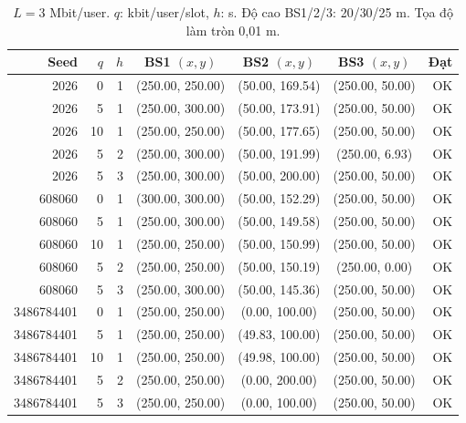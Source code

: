 \begin{table}
\centering
\renewcommand{\arraystretch}{1.16}
\setlength{\tabcolsep}{5pt}
\begin{tabular}{rrrcccr}
\toprule
Seed & $q$ & $h$ & BS1 $(x,y)$ & BS2 $(x,y)$ & BS3 $(x,y)$ & Đạt \\
\midrule
2026 & 0 & 1 & (250.00, 250.00) & (50.00, 169.54) & (250.00, 50.00) & OK \\
2026 & 5 & 1 & (250.00, 300.00) & (50.00, 173.91) & (250.00, 50.00) & OK \\
2026 & 10 & 1 & (250.00, 250.00) & (50.00, 177.65) & (250.00, 50.00) & OK \\
2026 & 5 & 2 & (250.00, 300.00) & (50.00, 191.99) & (250.00, 6.93) & OK \\
2026 & 5 & 3 & (250.00, 300.00) & (50.00, 200.00) & (250.00, 50.00) & OK \\
608060 & 0 & 1 & (300.00, 300.00) & (50.00, 152.29) & (250.00, 50.00) & OK \\
608060 & 5 & 1 & (250.00, 300.00) & (50.00, 149.58) & (250.00, 50.00) & OK \\
608060 & 10 & 1 & (250.00, 250.00) & (50.00, 150.99) & (250.00, 50.00) & OK \\
608060 & 5 & 2 & (250.00, 250.00) & (50.00, 150.19) & (250.00, 0.00) & OK \\
608060 & 5 & 3 & (250.00, 300.00) & (50.00, 145.36) & (250.00, 50.00) & OK \\
3486784401 & 0 & 1 & (250.00, 250.00) & (0.00, 100.00) & (250.00, 50.00) & OK \\
3486784401 & 5 & 1 & (250.00, 250.00) & (49.83, 100.00) & (250.00, 50.00) & OK \\
3486784401 & 10 & 1 & (250.00, 250.00) & (49.98, 100.00) & (250.00, 50.00) & OK \\
3486784401 & 5 & 2 & (250.00, 250.00) & (0.00, 200.00) & (250.00, 50.00) & OK \\
3486784401 & 5 & 3 & (250.00, 250.00) & (0.00, 100.00) & (250.00, 50.00) & OK \\
\bottomrule
\end{tabular}
\caption{$L=3$ Mbit/user. $q$: kbit/user/slot, $h$: s. Độ cao BS1/2/3: 20/30/25 m. Tọa độ làm tròn 0,01 m.}
\end{table}
